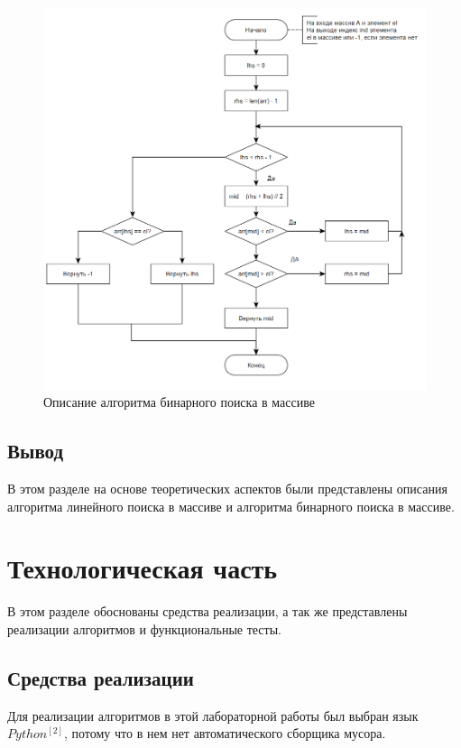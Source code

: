 \documentclass{article}
\begin{document}
\begin{figure}[h]
	\centering
	\includegraphics[scale=0.85]{tools/alg_2.png}
	\caption{Описание алгоритма бинарного поиска в массиве}
	\label{scheme:BP}
\end{figure}

\clearpage\subsection{Вывод}
В этом разделе на основе теоретических аспектов были представлены описания алгоритма линейного поиска в массиве
и алгоритма бинарного поиска в массиве.


\clearpage\section{Технологическая часть}
В этом разделе обоснованы средства реализации, а так же представлены реализации алгоритмов и функциональные тесты.

\subsection{Средства реализации}
Для реализации алгоритмов в этой лабораторной работы был выбран язык $Python^{[2]}$, потому что в нем нет 
автоматического сборщика мусора.
\end{document}

